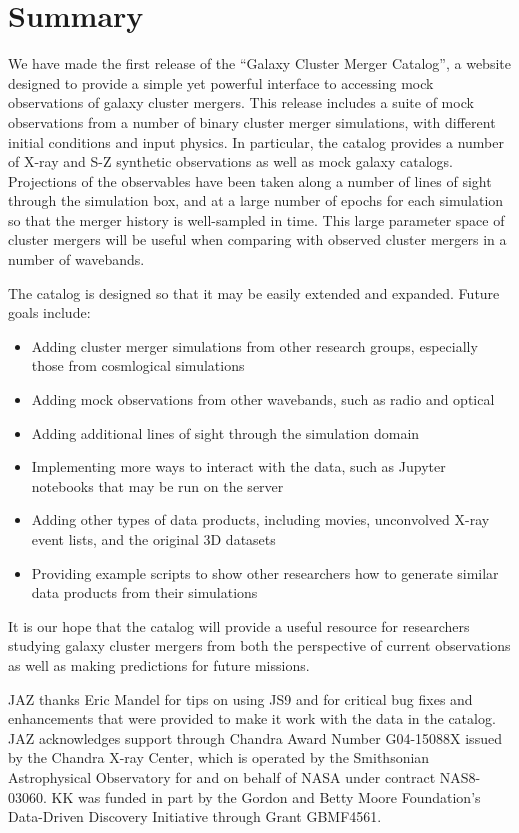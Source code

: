 \documentclass{emulateapj}
\begin{document}
\section{Summary}\label{sec:summary}

We have made the first release of the ``Galaxy Cluster Merger Catalog'', a website designed to provide a simple yet powerful interface to accessing mock observations of galaxy cluster mergers. This release includes a suite of mock observations from a number of binary cluster merger simulations, with different initial conditions and input physics. In particular, the catalog provides a number of X-ray and S-Z synthetic observations as well as mock galaxy catalogs. Projections of the observables have been taken along a number of lines of sight through the simulation box, and at a large number of epochs for each simulation so that the merger history is well-sampled in time. This large parameter space of cluster mergers will be useful when comparing with observed cluster mergers in a number of wavebands.

The catalog is designed so that it may be easily extended and expanded. Future goals include:

\begin{itemize}
\item Adding cluster merger simulations from other research groups, especially those from cosmlogical simulations
\item Adding mock observations from other wavebands, such as radio and optical
\item Adding additional lines of sight through the simulation domain
\item Implementing more ways to interact with the data, such as Jupyter notebooks that may be run on the server
\item Adding other types of data products, including movies, unconvolved X-ray event lists, and the original 3D datasets
\item Providing example scripts to show other researchers how to generate similar data products from their simulations
\end{itemize}

It is our hope that the catalog will provide a useful resource for researchers studying galaxy cluster mergers from both the perspective of current observations as well as making predictions for future missions.

\acknowledgements
JAZ thanks Eric Mandel for tips on using JS9 and for critical bug fixes and enhancements that were provided to make it work with the data in the catalog. JAZ acknowledges support through Chandra Award Number G04-15088X issued by the Chandra X-ray Center, which is operated by the Smithsonian Astrophysical Observatory for and on behalf of NASA under contract NAS8-03060.
KK was funded in part by the Gordon and Betty Moore Foundation's Data-Driven Discovery Initiative through Grant GBMF4561.
\end{document}

